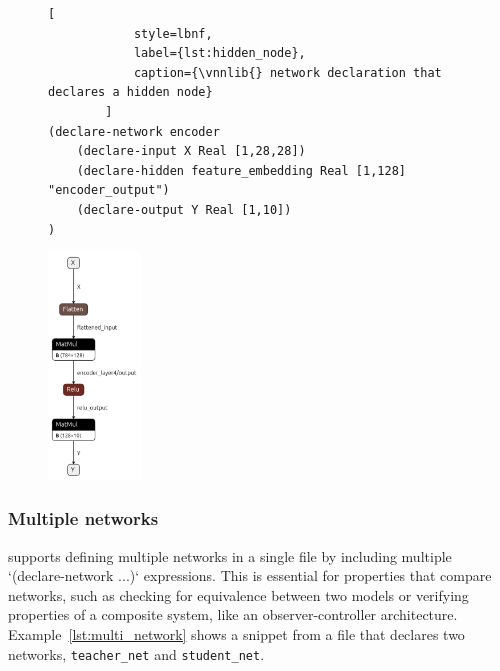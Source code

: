 \begin{figure}[h!]
    \begin{minipage}[c]{0.55\textwidth}
        \begin{lstlisting}[
            style=lbnf,
            label={lst:hidden_node},
            caption={\vnnlib{} network declaration that declares a hidden node}
        ]   
(declare-network encoder
    (declare-input X Real [1,28,28])
    (declare-hidden feature_embedding Real [1,128] "encoder_output")
    (declare-output Y Real [1,10])
)
        \end{lstlisting}
    \end{minipage}%
    \begin{minipage}[c]{0.45\textwidth}
        \centering
        \includegraphics[height=6cm]{imgs/encoder_net.onnx.png}
    \end{minipage}
\end{figure}

\subsubsection*{Multiple networks}
\label{sec:multi-network-declarations}
\vnnlib{} supports defining multiple networks in a single file by including multiple `(declare-network ...)` expressions. This is essential for properties that compare networks, 
such as checking for equivalence between two models or verifying properties of a composite system, like an observer-controller architecture. Example~\ref{lst:multi_network} 
shows a snippet from a \vnnlib{} file that declares two networks, \texttt{teacher\_net} and \texttt{student\_net}.

